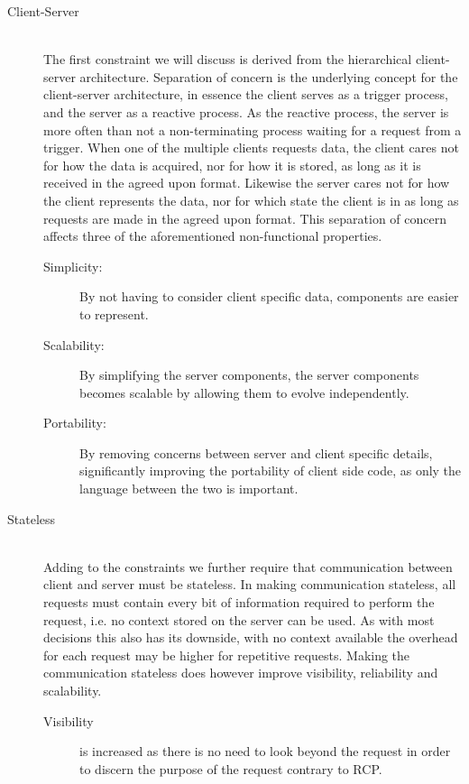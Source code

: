 \begin{description}
    \item [Client-Server\label{client-server-rest}] \hfill \\
    The first constraint we will discuss is derived from the hierarchical client-server architecture.
    Separation of concern is the underlying concept for the client-server architecture, in essence the client serves as a trigger process, and the server as a reactive process.
    As the reactive process, the server is more often than not a non-terminating process waiting for a request from a trigger.
    When one of the multiple clients requests data, the client cares not for how the data is acquired, nor for how it is stored, as long as it is received in the agreed upon format.
    Likewise the server cares not for how the client represents the data, nor for which state the client is in as long as requests are made in the agreed upon format.
    This separation of concern affects three of the aforementioned non-functional properties.
    \begin{description}
        \item[Simplicity:] By not having to consider client specific data, components are easier to represent.
        \item[Scalability:] By simplifying the server components, the server components becomes scalable by allowing them to evolve independently.
        \item[Portability:] By removing concerns between server and client specific details, significantly improving the portability of client side code, as only the language between the two is important.
    \end{description}
    \item [Stateless] \hfill \\
    Adding to the constraints we further require that communication between client and server must be stateless.
    In making communication stateless, all requests must contain every bit of information required to perform the request, i.e. no context stored on the server can be used.
    As with most decisions this also has its downside, with no context available the overhead for each request may be higher for repetitive requests.
    Making the communication stateless does however improve visibility, reliability and scalability.
    \begin{description}
        \item[Visibility] is increased as there is no need to look beyond the request in order to discern the purpose of the request contrary to RCP.

\end{description}
\end{description}

